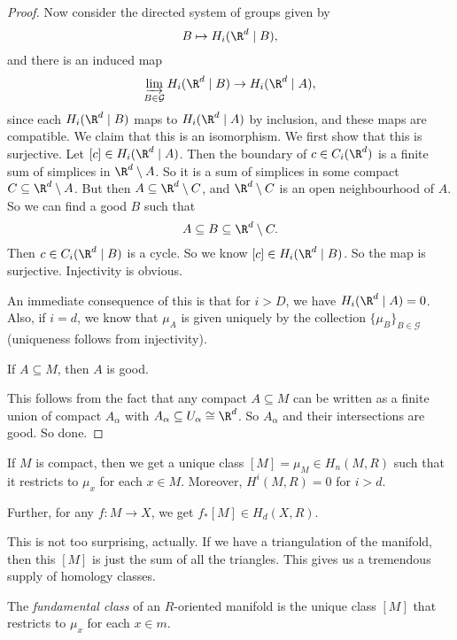 \documentclass[a4paper]{article}
\begin{document}
\begin{proof}
  Now consider the directed system of groups given by
  \[
    B \mapsto H_i(\R^d \mid B),
  \]
  and there is an induced map
  \[
    \varinjlim_{B \in \mathcal{G}} H_i(\R^d \mid B) \to H_i(\R^d \mid A),
  \]
  since each $H_i(\R^d \mid B)$ maps to $H_i(\R^d \mid A)$ by inclusion, and these maps are compatible. We claim that this is an isomorphism. We first show that this is surjective. Let $[c] \in H_i(\R^d \mid A)$. Then the boundary of $c \in C_i(\R^d)$ is a finite sum of simplices in $\R^d \setminus A$. So it is a sum of simplices in some compact $C \subseteq \R^d \setminus A$. But then $A \subseteq \R^d \setminus C$, and $\R^d \setminus C$ is an open neighbourhood of $A$. So we can find a good $B$ such that
  \[
    A \subseteq B \subseteq \R^d \setminus C.
  \]
  Then $c \in C_i(\R^d \mid B)$ is a cycle. So we know $[c] \in H_i(\R^d \mid B)$. So the map is surjective. Injectivity is obvious.

  An immediate consequence of this is that for $i > D$, we have $H_i(\R^d \mid A) = 0$. Also, if $i = d$, we know that $\mu_A$ is given uniquely by the collection $\{\mu_B\}_{B \in \mathcal{G}}$ (uniqueness follows from injectivity).

  \begin{claim}
    If $A \subseteq M$, then $A$ is good.
  \end{claim}
  This follows from the fact that any compact $A \subseteq M$ can be written as a finite union of compact $A_\alpha$ with $A_\alpha \subseteq U_\alpha \cong \R^d$. So $A_\alpha$ and their intersections are good. So done.
\end{proof}

\begin{cor}
  If $M$ is compact, then we get a unique class $[M] = \mu_M \in H_n(M, R)$ such that it restricts to $\mu_x$ for each $x \in M$. Moreover, $H^i(M, R) = 0$ for $i > d$.

Further, for any $f: M \to X$, we get $f_*[M] \in H_d(X, R)$.
\end{cor}
This is not too surprising, actually. If we have a triangulation of the manifold, then this $[M]$ is just the sum of all the triangles. This gives us a tremendous supply of homology classes.

\begin{defi}
  The \emph{fundamental class} of an $R$-oriented manifold is the unique class $[M]$ that restricts to $\mu_x$ for each $x \in m$.
\end{defi}
\end{document}
